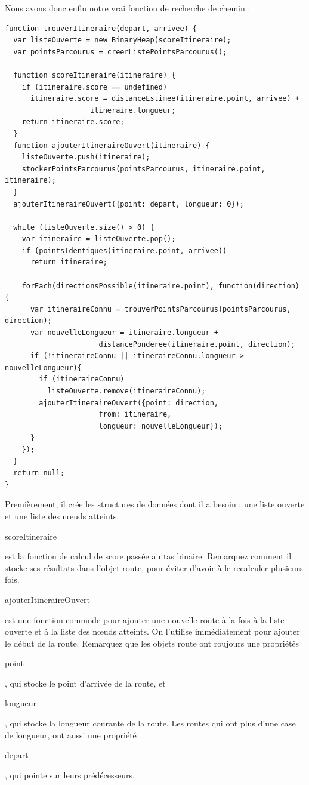 \documentclass{FramateX}
\renewcommand{\texttt}[1]{\begin{sffamily}{#1}\end{sffamily}}
\begin{document}
\begin{center}\end{center}

Nous avons donc enfin notre vrai fonction de recherche de chemin :

\begin{lstlisting}
function trouverItineraire(depart, arrivee) {
  var listeOuverte = new BinaryHeap(scoreItineraire);
  var pointsParcourus = creerListePointsParcourus();

  function scoreItineraire(itineraire) {
    if (itineraire.score == undefined)
      itineraire.score = distanceEstimee(itineraire.point, arrivee) +
                    itineraire.longueur;
    return itineraire.score;
  }
  function ajouterItineraireOuvert(itineraire) {
    listeOuverte.push(itineraire);
    stockerPointsParcourus(pointsParcourus, itineraire.point, itineraire);
  }
  ajouterItineraireOuvert({point: depart, longueur: 0});

  while (listeOuverte.size() > 0) {
    var itineraire = listeOuverte.pop();
    if (pointsIdentiques(itineraire.point, arrivee))
      return itineraire;

    forEach(directionsPossible(itineraire.point), function(direction) {
      var itineraireConnu = trouverPointsParcourus(pointsParcourus, direction);
      var nouvelleLongueur = itineraire.longueur +
                      distancePonderee(itineraire.point, direction);
      if (!itineraireConnu || itineraireConnu.longueur > nouvelleLongueur){
        if (itineraireConnu)
          listeOuverte.remove(itineraireConnu);
        ajouterItineraireOuvert({point: direction,
                      from: itineraire,
                      longueur: nouvelleLongueur});
      }
    });
  }
  return null;
}
\end{lstlisting}
Premièrement, il crée les structures de données dont il a besoin : une
liste ouverte et une liste des nœuds atteints. \texttt{scoreItineraire}
est la fonction de calcul de score passée au tas binaire. Remarquez
comment il stocke ses résultats dans l'objet route, pour éviter d'avoir
à le recalculer plusieurs fois.

\texttt{ajouterItineraireOuvert} est une fonction commode pour ajouter
une nouvelle route à la fois à la liste ouverte et à la liste des nœuds
atteints. On l'utilise immédiatement pour ajouter le début de la route.
Remarquez que les objets route ont roujours une propriétés
\texttt{point}, qui stocke le point d'arrivée de la route, et
\texttt{longueur}, qui stocke la longueur courante de la route. Les
routes qui ont plus d'une case de longueur, ont aussi une propriété
\texttt{depart}, qui pointe sur leurs prédécesseurs.
\end{document}

